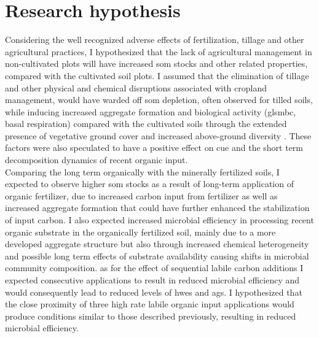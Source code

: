 \section{Research hypothesis}
	Considering the well recognized adverse effects of fertilization, tillage and other agricultural practices, I hypothesized that the lack of agricultural management in non-cultivated plots will have increased \gls{som} stocks and other related properties, compared with the cultivated soil plots. I assumed that the elimination of tillage and other physical and chemical disruptions associated with cropland management, would have warded off \gls{som} depletion, often observed for tilled soils, while inducing increased aggregate formation and biological activity (gls{mbc}, basal respiration)  compared with the cultivated soils through the extended presence of vegetative ground cover and increased above-ground diversity . These factors were also speculated to have a positive effect on \gls{cue} and the short term decomposition dynamics of recent organic input.\\
	Comparing the long term organically with the minerally fertilized soils, I expected to observe higher \gls{som} stocks as a result of long-term application of organic fertilizer, due to increased carbon input from fertilizer as well as increased aggregate formation that could have further enhanced the stabilization of input carbon.  I also expected increased microbial efficiency in processing recent organic substrate in the organically fertilized soil, mainly due to a more developed aggregate structure but also through increased chemical heterogeneity and possible long term effects of substrate availability causing shifts in microbial community composition.
	as for the effect of sequential labile carbon additions I expected consecutive applications to result in reduced microbial efficiency and would consequently lead to reduced levels of \gls{hwes} and \gls{ags}.  I hypothesized that the close proximity of three high rate labile organic input applications would produce conditions similar to those described previously, resulting in reduced microbial efficiency.

